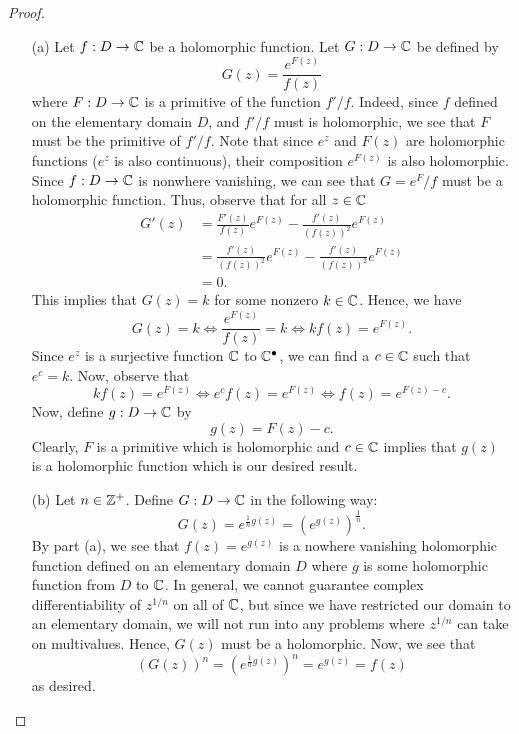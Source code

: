 \documentclass[a4paper]{article}
\begin{document}
\begin{proof}
\begin{enumerate}
    \item[(a)] Let \( f: D \to \mathbb{C}  \) be a holomorphic function. Let \( G: D \to \mathbb{C}   \) be defined by
        \[  G(z) =  \frac{ e^{F(z)} }{ f(z) }  \]
        where \( F: D \to \mathbb{C}  \) is a primitive of the function \( f' / f  \). Indeed, since \( f  \) defined on the elementary domain \( D  \), and \( f' / f  \) must is holomorphic, we see that \( F  \) must be the primitive of \( f' / f \). Note that since \( e^{z} \) and \( F(z) \) are holomorphic functions (\( e^{z} \) is also continuous), their composition \( e^{F(z)} \) is also holomorphic. Since \( f: D \to \mathbb{C}  \) is nonwhere vanishing, we can see that \( G =  e^{F} / f  \) must be a holomorphic function. Thus, observe that for all \( z \in \mathbb{C}  \)
        \begin{align*}
            G'(z) &= \frac{ F'(z) }{ f(z)  } e^{F(z)} - \frac{ f'(z)  }{  (f(z))^{2} } e^{F(z)} \\
                  &= \frac{ f'(z)  }{  (f(z))^{2} }  e^{F(z)} - \frac{ f'(z)  }{ (f(z))^{2} }  e^{F(z)} \\
                  &= 0. 
        \end{align*}
        This implies that \( G(z) = k  \) for some nonzero \( k \in \mathbb{C}  \). Hence, we have
        \[  G(z) = k  \iff \frac{ e^{F(z)} }{ f(z) }  = k \iff kf(z) = e^{F(z)}. \]
        Since \( e^{z} \) is a surjective function \( \mathbb{C}  \) to \( \mathbb{C}^{\bullet} \), we can find a \( c \in \mathbb{C}  \) such that \( e^{c} = k  \). Now, observe that 
        \[  k f(z) = e^{F(z)} \iff e^{c} f(z) = e^{F(z)} \iff f(z) = e^{F(z) - c}. \]
        Now, define \( g: D \to \mathbb{C}   \) by 
        \[  g(z) = F(z) - c. \]
        Clearly, \( F  \) is a primitive which is holomorphic and \( c \in \mathbb{C}   \) implies that \( g(z) \) is a holomorphic function which is our desired result.

    \item[(b)] Let \( n \in \mathbb{Z}^{+} \). Define \( G: D \to \mathbb{C}  \) in the following way:
        \[  G(z) = e^{\frac{ 1 }{ n } g(z)} = ( e^{g(z)} )^{\frac{ 1 }{ n } }. \]
        By part (a), we see that \( f(z) = e^{g(z)} \) is a nowhere vanishing holomorphic function defined on an elementary domain \( D  \) where \( g  \) is some holomorphic function from \( D  \) to \( \mathbb{C}  \). In general, we cannot guarantee complex differentiability of \( z^{1/n} \) on all of \( \mathbb{C}  \), but since we have restricted our domain to an elementary domain, we will not run into any problems where \( z^{1/n} \) can take on multivalues. Hence, \( G(z) \) must be a holomorphic. Now, we see that  
        \[  (G(z))^{n} = (e^{\frac{ 1 }{ n } g(z)})^{n} = e^{g(z)} = f(z) \]
        as desired.
    \end{enumerate}
\end{proof}
\end{document}
